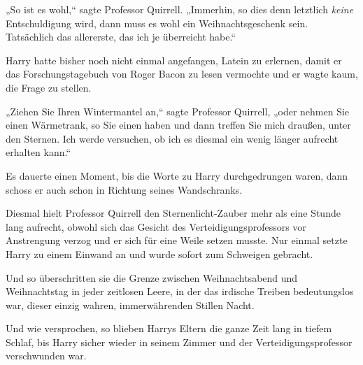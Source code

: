 „So ist es wohl,“ sagte Professor Quirrell. „Immerhin, so dies denn letztlich \emph{keine} Entschuldigung wird, dann muss es wohl ein Weihnachtsgeschenk sein. Tatsächlich das allererste, das ich je überreicht habe.“

Harry hatte bisher noch nicht einmal angefangen, Latein zu erlernen, damit er das Forschungstagebuch von Roger Bacon zu lesen vermochte und er wagte kaum, die Frage zu stellen.

„Ziehen Sie Ihren Wintermantel an,“ sagte Professor Quirrell, „oder nehmen Sie einen Wärmetrank, so Sie einen haben und dann treffen Sie mich draußen, unter den Sternen. Ich werde versuchen, ob ich es diesmal ein wenig länger aufrecht erhalten kann.“

Es dauerte einen Moment, bis die Worte zu Harry durchgedrungen waren, dann schoss er auch schon in Richtung seines Wandschranks.

Diesmal hielt Professor Quirrell den Sternenlicht-Zauber mehr als eine Stunde lang aufrecht, obwohl sich das Gesicht des Verteidigungsprofessors vor Anstrengung verzog und er sich für eine Weile setzen musste. Nur einmal setzte Harry zu einem Einwand an und wurde sofort zum Schweigen gebracht.

Und so überschritten sie die Grenze zwischen Weihnachtsabend und Weihnachtstag in jeder zeitlosen Leere, in der das irdische Treiben bedeutungslos war, dieser einzig wahren, immerwährenden Stillen Nacht.

Und wie versprochen, so blieben Harrys Eltern die ganze Zeit lang in tiefem Schlaf, bis Harry sicher wieder in seinem Zimmer und der Verteidigungsprofessor verschwunden war.

